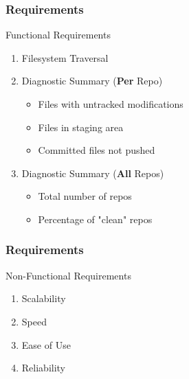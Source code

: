 \begin{frame}
	\centering
	\frametitle{Requirements}
	
	\begin{block}{Functional Requirements}
		\begin{enumerate}
			\item <1-> Filesystem Traversal
			\item <2->Diagnostic Summary (\textbf{Per} Repo)
			\pause
			\begin{itemize}
				\item <2-> Files with untracked modifications
				\item <2-> Files in staging area
				\item <2-> Committed files not pushed
			\end{itemize}
			\item <3-> Diagnostic Summary (\textbf{All} Repos)
			\begin{itemize}
				\item <3-> Total number of repos
				\item <3-> Percentage of "clean" repos
			\end{itemize}
		\end{enumerate}		
	\end{block}
	

\end{frame}

\begin{frame}
	\centering
	\frametitle{Requirements}
	
	
	\begin{block}{Non-Functional Requirements}
		\begin{enumerate}
			\item <1->Scalability
			\item <2-> Speed
			\item <3-> Ease of Use
			\item <4-> Reliability
		\end{enumerate}		
	\end{block}
	
	\vspace{1.5cm}
\end{frame}
